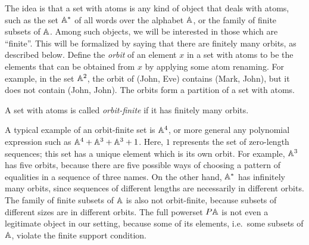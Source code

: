 The idea is that a set with atoms is any kind of object that deals with atoms, such as the set $\mathbb A^*$ of all words over the alphabet $\mathbb A$, or the family of finite subsets of $\mathbb A$. Among such objects, we will be interested in those which are ``finite''. This will be formalized by  saying that there are  finitely many orbits, as described below.
Define the \emph{orbit} of an element $x$ in a set with atoms to be the elements that can be obtained from $x$ by applying some atom renaming. For example, in the set $\mathbb A^2$,  the orbit of (John, Eve)   contains  (Mark, John), but it does not contain (John, John). The orbits form a partition of a set with atoms. 


\begin{definition}   A set with atoms is called \emph{orbit-finite} if it has finitely many orbits. 
\end{definition}

A typical example of an orbit-finite set is $\mathbb A^4$, or more general any polynomial expression such as $\mathbb A^4 + \mathbb A^3 + \mathbb A^3 + 1$. Here, $1$ represents the set of zero-length sequences; this set has a unique element which is its own orbit.  For  example,  $\mathbb A^3$ has five orbits, because there are five possible ways of choosing a pattern of equalities in a sequence of three names. On the other hand,  $\mathbb A^*$ has infinitely many orbits, since sequences of different lengths are necessarily in different orbits.   The family of finite subsets of $\mathbb A$  is also  not orbit-finite, because subsets of different sizes are in different orbits. The full powerset $\powerset \atoms$ is not even a legitimate object in our setting, because some of its elements, i.e.~some subsets of $\mathbb A$, violate the finite support condition. 

        
